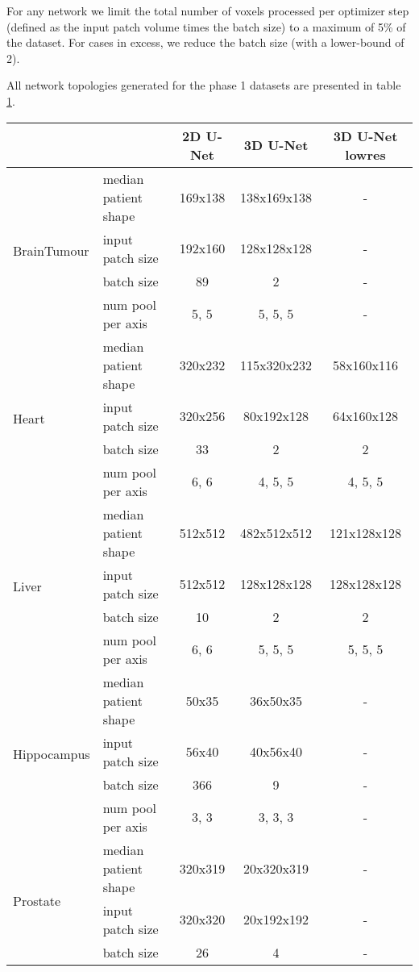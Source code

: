 \documentclass{templates/llncs}
\begin{document}
    For any network we limit the total number of voxels processed per optimizer step (defined as the input patch volume times the batch size) to a maximum of 5\% of the dataset. For cases in excess, we reduce the batch size (with a lower-bound of 2). 

    All network topologies generated for the phase 1 datasets are presented in table \ref{segmentation_architectures}.
    
\begin{table}[t]
    \label{segmentation_architectures}
    \scriptsize
    \begin{tabular}{ll|ccc}
    & & 2D U-Net & 3D U-Net & 3D U-Net lowres \\
    \hline
    \multirow{4}{*}{BrainTumour} & median patient shape & 169x138 & 138x169x138 & - \\
     & input patch size & 192x160 & 128x128x128 & - \\
     & batch size & 89 & 2 & - \\
     & num pool per axis & 5, 5 & 5, 5, 5 & - \\
     \hline
    \multirow{4}{*}{Heart} & median patient shape & 320x232 & 115x320x232 & 58x160x116 \\
     & input patch size & 320x256 & 80x192x128 & 64x160x128 \\
     & batch size & 33 & 2 & 2 \\
     & num pool per axis & 6, 6 & 4, 5, 5 & 4, 5, 5 \\
    \hline
    \multirow{4}{*}{Liver} & median patient shape & 512x512 & 482x512x512 & 121x128x128 \\
     & input patch size & 512x512 & 128x128x128 & 128x128x128 \\
     & batch size & 10 & 2 & 2 \\
     & num pool per axis & 6, 6 & 5, 5, 5 & 5, 5, 5 \\
    \hline
    \multirow{4}{*}{Hippocampus} & median patient shape & 50x35 & 36x50x35 & - \\
     & input patch size & 56x40 & 40x56x40 & - \\
     & batch size & 366 & 9 & - \\
     & num pool per axis & 3, 3 & 3, 3, 3 & - \\
    \hline
    \multirow{4}{*}{Prostate} & median patient shape & 320x319 & 20x320x319 & - \\
     & input patch size & 320x320 & 20x192x192 & - \\
     & batch size & 26 & 4 & - \\

\end{tabular}
\end{table}
\end{document}
